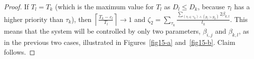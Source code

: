 \documentclass[12pt,english]{report}
\newtheorem{proof}{Proof}
\begin{document}
\begin{proof}
If $T_{l}=T_{k}$ (which is
the maximum value for $T_{l}$ as $D_{l}\le D_{k}$, because
$\tau_{l}$ has a higher priority than $\tau_{k}$), then $\left\lceil\frac{T_{k}-c_{l}}{T_{l}}\right\rceil\rightarrow1$
and $\zeta_2=\sum_{\tau_{k}}\frac{\sum_{\left(\tau_{l}\in\gamma_{k}\right)\wedge\left(p_{l}>p_{k}\right)}2\beta_{k,l}}{t_{k}}$. 
This means that the system will be controlled by only two parameters, $\beta_{i,j}$ and $\beta_{k,l}$, as in the previous two cases, illustrated in Figures~\ref{fig15-a} and~\ref{fig15-b}. Claim follows.
\end{proof}

\begin{figure}
\begin{centering}
\end{centering}
\end{figure}
\end{document}
